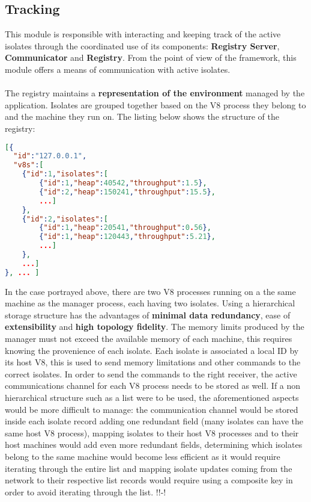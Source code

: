 \documentclass{l4proj}
\begin{document}
\subsection{Tracking}
\hspace*{3em} This module is responsible with interacting and keeping track of the active isolates through the coordinated use of its components: \textbf{Registry Server}, \textbf{Communicator} and \textbf{Registry}. From the point of view of the framework, this module offers a means of communication with active isolates.
\\\\ %
\hspace*{3em} The registry maintains a \textbf{representation of the environment} managed by the application. Isolates are grouped together based on the V8 process they belong to and the machine they run on. The listing below shows the structure of the registry:
\begin{lstlisting}[language=json,firstnumber=1]
[{
  "id":"127.0.0.1",
  "v8s":[
  	{"id":1,"isolates":[
  		{"id":1,"heap":40542,"throughput":1.5},
  		{"id":2,"heap":150241,"throughput":15.5},
		...]
	},
  	{"id":2,"isolates":[
		{"id":1,"heap":20541,"throughput":0.56},
        {"id":1,"heap":120443,"throughput":5.21},
		...]
	},
	...]
}, ... ]
\end{lstlisting}
In the case portrayed above, there are two V8 processes running on a the same machine as the manager process, each having two isolates. Using a hierarchical storage structure has the advantages of \textbf{minimal data redundancy}, ease of \textbf{extensibility} and \textbf{high topology fidelity}. The memory limits produced by the manager must not exceed the available memory of each machine, this requires knowing the provenience of each isolate. Each isolate is associated a local ID by its host V8, this is used to send memory limitations and other commands to the correct isolates. In order to send the commands to the right receiver, the active communications channel for each V8 process needs to be stored as well. If a non hierarchical structure such as a list were to be used, the aforementioned aspects would be more difficult to manage: the communication channel would be stored inside each isolate record adding one redundant field (many isolates can have the same host V8 process), mapping isolates to their host V8 processes and to their host machines would add even more redundant fields, determining which isolates belong to the same machine would become less efficient as it would require iterating through the entire list and mapping isolate updates coming from the network to their respective list records would require using a composite key in order to avoid iterating through the list. !!-!
\end{document}
